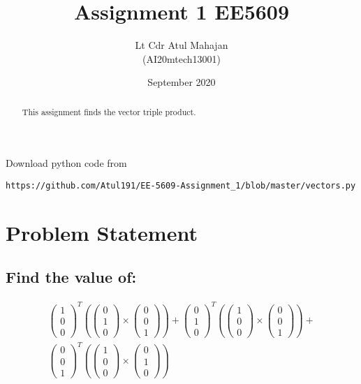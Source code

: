 \documentclass[journal,12pt,twocolumn]{IEEEtran}
\title{Assignment 1 EE5609}
\author{Lt Cdr Atul Mahajan\\ (AI20mtech13001) }
\date{September 2020}
\providecommand{\brak}[1]{\ensuremath{\left(#1\right)}}
\newcommand{\myvec}[1]{\ensuremath{\begin{pmatrix}#1\end{pmatrix}}}
\begin{document}
\maketitle
\begin{abstract}
This assignment finds the vector triple product.
\end{abstract}
Download python code from 
\begin{lstlisting}
https://github.com/Atul191/EE-5609-Assignment_1/blob/master/vectors.py
\end{lstlisting}
\section{Problem Statement}
\subsection{Find the value of:}
\begin{align*}
\myvec{1\\0\\0}^{T}
\brak{
\myvec{0\\1\\0}\times
\myvec{0\\0\\1}
}
+
\myvec{0\\1\\0}^{T}
\brak{
\myvec{1\\0\\0}\times
\myvec{0\\0\\1}
}
+\\
\myvec{0\\0\\1}^{T}
\brak{
\myvec{1\\0\\0}\times
\myvec{0\\1\\0}
}
\end{align*}
\end{document}
